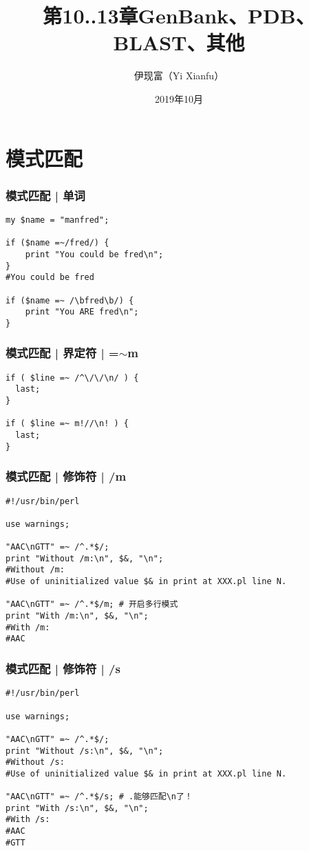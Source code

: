 


\title[其他]{第10..13章\quad GenBank、PDB、BLAST、其他}
\author[Yixf]{伊现富（Yi Xianfu）}
\date{2019年10月}




\section{模式匹配}
\begin{frame}[fragile]
  \frametitle{模式匹配 | 单词}
\begin{lstlisting}
my $name = "manfred";

if ($name =~/fred/) {
    print "You could be fred\n";
}
#You could be fred

if ($name =~ /\bfred\b/) {
    print "You ARE fred\n";
}
\end{lstlisting}
\end{frame}

\begin{frame}[fragile]
  \frametitle{模式匹配 | 界定符 | =$\sim$m}
\begin{lstlisting}
if ( $line =~ /^\/\/\n/ ) {
  last;
}

if ( $line =~ m!//\n! ) {
  last;
}
\end{lstlisting}
\end{frame}

\begin{frame}[fragile]
  \frametitle{模式匹配 | 修饰符 | /m}
\begin{lstlisting}
#!/usr/bin/perl

use warnings;

"AAC\nGTT" =~ /^.*$/;
print "Without /m:\n", $&, "\n";
#Without /m:
#Use of uninitialized value $& in print at XXX.pl line N.

"AAC\nGTT" =~ /^.*$/m; # 开启多行模式
print "With /m:\n", $&, "\n";
#With /m:
#AAC
\end{lstlisting}
\end{frame}

\begin{frame}[fragile]
  \frametitle{模式匹配 | 修饰符 | /s}
\begin{lstlisting}
#!/usr/bin/perl

use warnings;

"AAC\nGTT" =~ /^.*$/;
print "Without /s:\n", $&, "\n";
#Without /s:
#Use of uninitialized value $& in print at XXX.pl line N.

"AAC\nGTT" =~ /^.*$/s; # .能够匹配\n了！
print "With /s:\n", $&, "\n";
#With /s:
#AAC
#GTT
\end{lstlisting}
\end{frame}

